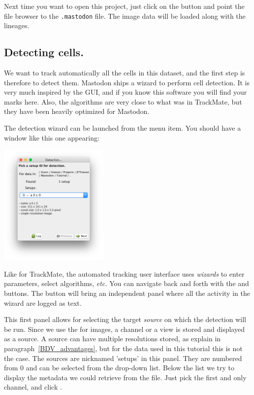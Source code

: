 Next time you want to open this project, just click on the  button and point the file browser to the \texttt{.mastodon} file.
The image data will be loaded along with the lineages.



\subsection{Detecting cells.}

We want to track automatically all the cells in this dataset, and the first step is therefore to detect them.
Mastodon ships a wizard to perform cell detection. 
It is very much inspired by the  GUI, and if you know this software you will find your marks here.
Also, the algorithms are very close to what was in TrackMate, but they have been heavily optimized for Mastodon.

The detection wizard can be launched from the  menu item. 
You should have a window like this one appearing:
\begin{center}
         \includegraphics[width=0.4\textwidth]{figures/Mastodon_DetectionWizard_01.png}
\end{center}

Like for TrackMate, the automated tracking user interface uses \textit{wizards} to enter parameters, select algorithms, \textit{etc.}
You can navigate back and forth with the  and   buttons. 
The  button will bring an independent panel where all the activity in the wizard are logged as text. 

This first panel allows for selecting the target \textit{source} on which the detection will be run. 
Since we use the \bdv for images, a channel or a view is stored and displayed as a source. 
A source can have multiple resolutions stored, as explain in paragraph~\ref{BDV_advantages}, but for the data used in this tutorial this is not the case. The sources are nicknamed 'setups' in this panel.
They are numbered from 0 and can be selected from the drop-down list. 
Below the list we try to display the metadata we could retrieve from the \bdv file.
Just pick the first and only channel, and click .

